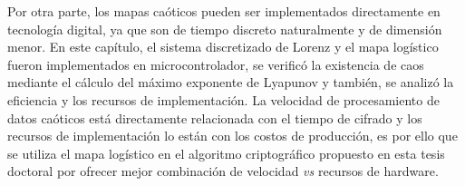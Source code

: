 Por otra parte, los mapas caóticos pueden ser implementados directamente en tecnología digital, ya que son de tiempo discreto naturalmente y de dimensión menor. En este capítulo, el sistema discretizado de Lorenz y el mapa logístico fueron implementados en microcontrolador, se verificó la existencia de caos mediante el cálculo del máximo exponente de Lyapunov y también, se analizó la eficiencia y los recursos de implementación. La velocidad de procesamiento de datos caóticos está directamente relacionada con el tiempo de cifrado y los recursos de implementación lo están con los costos de producción, es por ello que se utiliza el mapa logístico en el algoritmo criptográfico propuesto en esta tesis doctoral por ofrecer mejor combinación de velocidad \textit{vs} recursos de hardware.   

